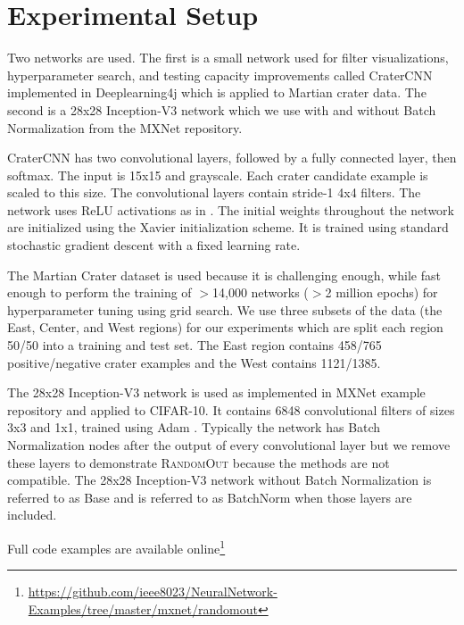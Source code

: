 \documentclass{article}
\begin{document}
	
\section{Experimental Setup}
\label{sec:expsetup}


Two networks are used. The first is a small network used for filter visualizations, hyperparameter search, and testing capacity improvements called CraterCNN \cite{cohen_crater_2016} implemented in Deeplearning4j \cite{deeplearning4j_development_team_deeplearning4j:_2015} which is applied to Martian crater data. The second is a 28x28 Inception-V3 network which we use with and without Batch Normalization \cite{chen_mxnet:_2015} \cite{szegedy_rethinking_2015} from the MXNet repository. 



CraterCNN has two convolutional layers, followed by a fully connected layer, then softmax. The input is 15x15 and grayscale. Each crater candidate example is scaled to this size. The convolutional layers contain stride-1 4x4 filters.  The network uses ReLU activations as in \cite{krizhevsky_imagenet_2012}. The initial weights throughout the network are initialized using the Xavier initialization \cite{glorot_understanding_2010} scheme. It is trained using standard stochastic gradient descent with a fixed learning rate.

The Martian Crater dataset \cite{bandeira_automatic_2010} is used because it is challenging enough, while fast enough to perform the training of $>$14,000 networks ($>$2 million epochs) for hyperparameter tuning using grid search. We use three subsets of the data (the East, Center, and West regions) for our experiments which are split each region 50/50 into a training and test set. The East region contains 458/765 positive/negative crater examples and the West contains 1121/1385.

The 28x28 Inception-V3 network is used as implemented in MXNet example repository \cite{chen_mxnet:_2015} \cite{szegedy_rethinking_2015} and applied to CIFAR-10. It contains 6848 convolutional filters of sizes 3x3 and 1x1, trained using Adam \cite{kingma_adam:_2014}. Typically the network has Batch Normalization nodes after the output of every convolutional layer but we remove these layers to demonstrate \textsc{RandomOut} because the methods are not compatible. The 28x28 Inception-V3 network without Batch Normalization is referred to as Base and is referred to as BatchNorm when those layers are included.

Full code examples are available online\footnote{\url{https://github.com/ieee8023/NeuralNetwork-Examples/tree/master/mxnet/randomout}}
\end{document}
